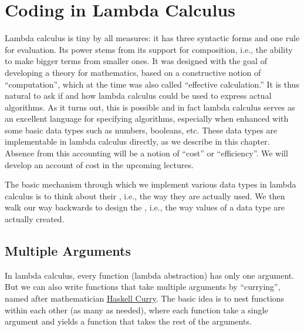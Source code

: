 \chapter{Coding in Lambda Calculus}
\label{ch:lcc}

\begin{preamble}
\label{prmbl:lcc}
Lambda calculus is tiny by all measures: it has three syntactic forms and one rule for evaluation.  
%
Its power stems from its support for composition, i.e., the ability to make bigger terms from smaller ones. 
%
It was designed with the goal of developing a theory for mathematics,  based on a constructive notion of ``computation'', which at the time was also called ``effective calculation.''
%
It is thus natural to ask if and how lambda calculus could be used to express actual algorithms.   As it turns out, this is possible and in fact lambda calculus serves as an excellent language for specifying algorithms, especially when enhanced with some basic data types such as numbers, booleans, etc.
%
These data types are implementable in lambda calculus directly, as we describe
in this chapter.
%
Absence from this accounting will be a notion of ``cost'' or ``efficiency''.
%
We will develop an account of cost in the upcoming lectures.
\end{preamble}

\begin{gram}
\label{grm:lcc::intro-elim}
The basic mechanism through which we implement various data types in lambda calculus is to think about their , i.e., the way they are actually used.  
%
We then walk our way backwards to design the , i.e., the way values of a data type are actually created. 
\end{gram}

\section{Multiple Arguments}

\begin{gram}
\label{grm:lcc::currying}
In lambda calculus, every function (lambda abstraction) has only one
argument.  
%
But we can also write functions that take multiple arguments by ``currying'', named after mathematician \href{https://en.wikipedia.org/wiki/Haskell_Curry}{Haskell Curry}.
%
The basic idea is to nest functions within each other (as many as needed), where each function take a single argument and yields a function that takes the rest of the arguments.
\end{gram}

